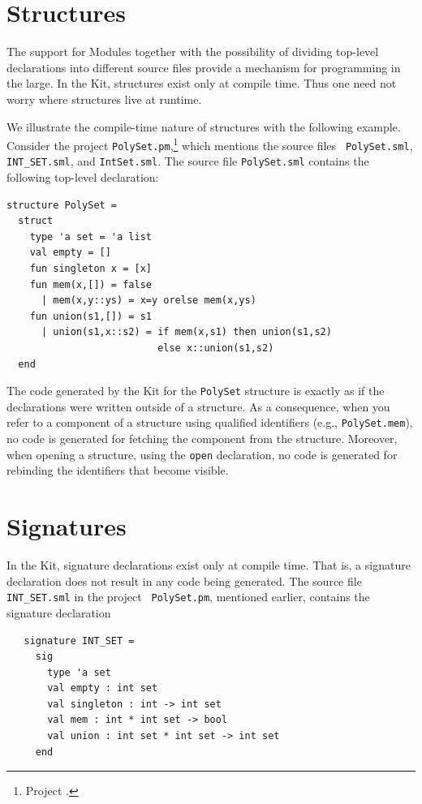\documentclass[12pt]{book}
\begin{document}
\section{Structures}
The support for Modules together with the possibility of dividing
top-level declarations into different source files provide a mechanism
for programming in the large. In the Kit, structures exist only at
compile time.  Thus one need not worry where
%
structures live at runtime.

We illustrate the compile-time nature of structures with the following
example. Consider the project {\tt PolySet.pm},\footnote{Project
  .} which mentions the source files {\tt
  PolySet.sml}, {\tt INT\_SET.sml}, and {\tt IntSet.sml}. The source
file {\tt PolySet.sml} contains the following top-level declaration:
\newpage
\begin{verbatim}
structure PolySet =
  struct
    type 'a set = 'a list
    val empty = []
    fun singleton x = [x]
    fun mem(x,[]) = false
      | mem(x,y::ys) = x=y orelse mem(x,ys)
    fun union(s1,[]) = s1
      | union(s1,x::s2) = if mem(x,s1) then union(s1,s2)
                          else x::union(s1,s2)
  end
\end{verbatim}
The code generated by the Kit for the {\tt PolySet} structure is
exactly as if the declarations were written outside of a structure.
As a consequence, when you refer to a component of a structure using
qualified identifiers (e.g., {\tt PolySet.mem}), no code is generated
for fetching the component from the structure. Moreover, when opening
a structure, using the
%
{\tt open} declaration, no code is generated for rebinding the
identifiers that become visible.

\section{Signatures}
%
In the Kit, signature declarations exist only at compile time. That
is, a signature declaration does not result in any code being
generated. The source file {\tt INT\_SET.sml} in the project {\tt
  PolySet.pm}, mentioned earlier, contains the signature declaration
\begin{verbatim}
   signature INT_SET =
     sig
       type 'a set
       val empty : int set
       val singleton : int -> int set
       val mem : int * int set -> bool
       val union : int set * int set -> int set
     end
\end{verbatim}
\end{document}
